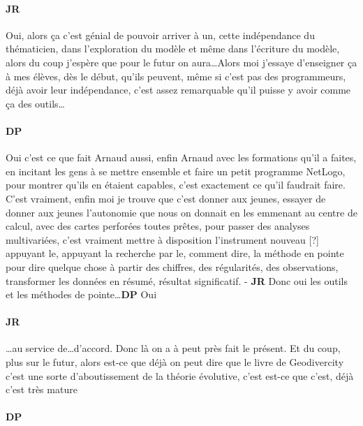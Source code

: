 \documentclass[12pt]{article}
\begin{document}
\paragraph{JR}

Oui, alors ça c'est génial de pouvoir arriver à un, cette indépendance du thématicien, dans l'exploration du modèle et même dans l'écriture du modèle, alors du coup j'espère que pour le futur on aura\ldots Alors moi j'essaye d'enseigner ça à mes élèves, dès le début, qu'ils peuvent, même si c'est pas des programmeurs, déjà avoir leur indépendance, c'est assez remarquable qu'il puisse y avoir comme ça des outils\ldots


\paragraph{DP}

Oui c'est ce que fait Arnaud aussi, enfin Arnaud avec les formations qu'il a faites, en incitant les gens à se mettre ensemble et faire un petit programme NetLogo, pour montrer qu'ils en étaient capables, c'est exactement ce qu'il faudrait faire. C'est vraiment, enfin moi je trouve que c'est donner aux jeunes, essayer de donner aux jeunes l'autonomie que nous on donnait en les emmenant au centre de calcul, avec des cartes perforées toutes prêtes, pour passer des analyses multivariées, c'est vraiment mettre à disposition l'instrument nouveau [?] appuyant le, appuyant la recherche par le, comment dire, la méthode en pointe pour dire quelque chose à partir des chiffres, des régularités, des observations, transformer les données en résumé, résultat significatif. - \textbf{JR} Donc oui les outils et les méthodes de pointe\ldots \textbf{DP} Oui

\paragraph{JR}

\ldots au service de\ldots d'accord. Donc là on a à peut près fait le présent. Et du coup, plus sur le futur, alors est-ce que déjà on peut dire que le livre de Geodivercity c'est une sorte d'aboutissement de la théorie évolutive, c'est est-ce que c'est, déjà c'est très mature

\paragraph{DP}
\end{document}
